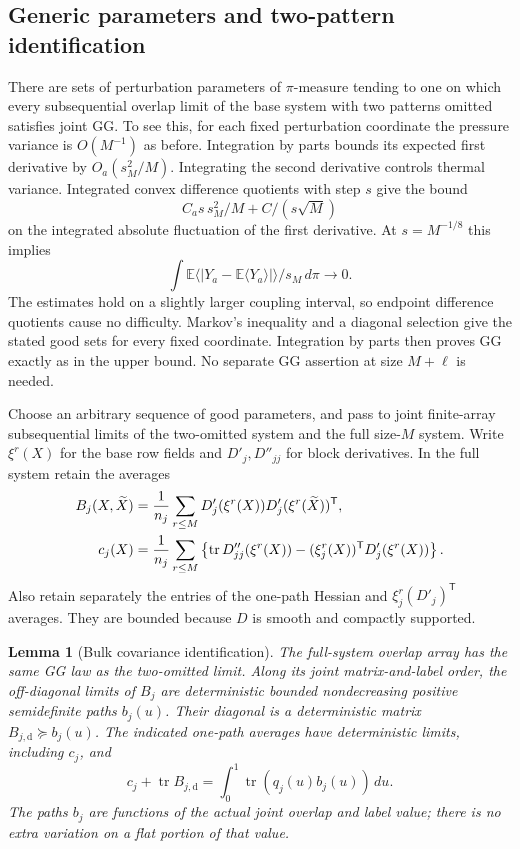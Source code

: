 \documentclass[11pt]{article}
\numberwithin{equation}{section}
\newtheorem{lemma}[theorem]{Lemma}
\theoremstyle{definition}
\newcommand{\E}{\mathbb E}
\newcommand{\tr}{\operatorname{tr}}
\begin{document}
\subsection{Generic parameters and two-pattern identification}
There are sets of perturbation parameters of $\pi$-measure tending to one on which every subsequential overlap limit of the base system with two patterns omitted satisfies joint GG. To see this, for each fixed perturbation coordinate the pressure variance is $O(M^{-1})$ as before. Integration by parts bounds its expected first derivative by $O_a(s_M^2/M)$. Integrating the second derivative controls thermal variance. Integrated convex difference quotients with step $s$ give the bound
\[
C_a s\,s_M^2/M+C/(s\sqrt M)
\]
on the integrated absolute fluctuation of the first derivative. At $s=M^{-1/8}$ this implies
\[
\int\E\langle|Y_a-\E\langle Y_a\rangle|\rangle/s_M\,d\pi\longrightarrow0.
\]
The estimates hold on a slightly larger coupling interval, so endpoint difference quotients cause no difficulty. Markov's inequality and a diagonal selection give the stated good sets for every fixed coordinate. Integration by parts then proves GG exactly as in the upper bound. No separate GG assertion at size $M+\ell$ is needed.

Choose an arbitrary sequence of good parameters, and pass to joint finite-array subsequential limits of the two-omitted system and the full size-$M$ system. Write $\xi^r(X)$ for the base row fields and $D'_j,D''_{jj}$ for block derivatives. In the full system retain the averages
\begin{align}\label{eq:bulk}
B_j(X,\widetilde X)&=
\frac1{n_j}\sum_{r\le M}D'_j(\xi^r(X))D'_j(\xi^r(\widetilde X))^{\mathsf T},\notag\\
c_j(X)&=\frac1{n_j}\sum_{r\le M}
\left\{\tr D''_{jj}(\xi^r(X))-(\xi_j^r(X))^{\mathsf T}D'_j(\xi^r(X))\right\}.
\end{align}
Also retain separately the entries of the one-path Hessian and $\xi_j^r(D'_j)^{\mathsf T}$ averages. They are bounded because $D$ is smooth and compactly supported.

\begin{lemma}[Bulk covariance identification]\label{lem:bulk}
The full-system overlap array has the same GG law as the two-omitted limit. Along its joint matrix-and-label order, the off-diagonal limits of $B_j$ are deterministic bounded nondecreasing positive semidefinite paths $b_j(u)$. Their diagonal is a deterministic matrix $B_{j,\mathrm d}\succeq b_j(u)$. The indicated one-path averages have deterministic limits, including $c_j$, and
\begin{equation}\label{eq:bulkidentity}
c_j+\tr B_{j,\mathrm d}
=\int_0^1\tr(q_j(u)b_j(u))\,du.
\end{equation}
The paths $b_j$ are functions of the actual joint overlap and label value; there is no extra variation on a flat portion of that value.
\end{lemma}
\end{document}
